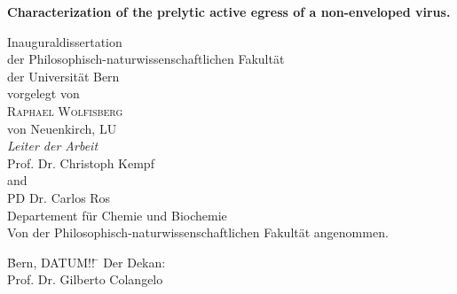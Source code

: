 \documentclass[11pt, titlepage, a4paper, twoside, onecolumn, DIV=calc]{scrbook} %
\begin{document}
\begin{titlepage}
\vspace{-1cm}
\begin{flushright}
\end{flushright}
\begin{center}
\begin{spacing}{2.5}
{\Huge \bfseries Characterization of the prelytic active egress of a non-enveloped virus.} \\[1 cm]
\end{spacing}
{\Large Inauguraldissertation \\
der Philosophisch-naturwissenschaftlichen Fakultät \\
der Universität Bern \\[1.3 cm]
{\large vorgelegt von}\\[0.3 cm]
{\LARGE \textsc{Raphael Wolfisberg}} \\[0.3 cm] 
{\large von Neuenkirch, LU} \\ [1.3 cm]
{\Large \emph{Leiter der Arbeit}\\ [0.3 cm]
{\textsc Prof. Dr. Christoph Kempf} \\
and \\
{\textsc PD Dr. Carlos Ros} \\ [0.9 cm]
Departement für Chemie und Biochemie} \\[0.8cm]
Von der Philosophisch-naturwissenschaftlichen Fakultät angenommen.} \\[1cm]
\end{center}
\begin{tabbing}

\= Bern, DATUM!! \= \hspace{5.5cm} Der Dekan: \\[1.5cm]
\> \> \hspace{5.5cm} Prof. Dr. Gilberto Colangelo
\end{tabbing}
\end{titlepage}










\cleardoublepage







\end{document}
